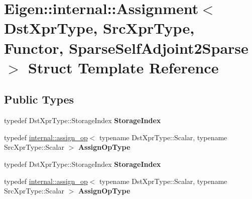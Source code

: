 \hypertarget{struct_eigen_1_1internal_1_1_assignment_3_01_dst_xpr_type_00_01_src_xpr_type_00_01_functor_00_017b35cf78061a31c93b838bddfa619fa3}{}\section{Eigen\+:\+:internal\+:\+:Assignment$<$ Dst\+Xpr\+Type, Src\+Xpr\+Type, Functor, Sparse\+Self\+Adjoint2\+Sparse $>$ Struct Template Reference}
\label{struct_eigen_1_1internal_1_1_assignment_3_01_dst_xpr_type_00_01_src_xpr_type_00_01_functor_00_017b35cf78061a31c93b838bddfa619fa3}
\subsection*{Public Types}
\begin{DoxyCompactItemize}
\item 
\mbox{\label{struct_eigen_1_1internal_1_1_assignment_3_01_dst_xpr_type_00_01_src_xpr_type_00_01_functor_00_017b35cf78061a31c93b838bddfa619fa3_a429efae6af903e6754d8ed4bfd28948a}} 
typedef Dst\+Xpr\+Type\+::\+Storage\+Index {\bfseries Storage\+Index}
\item 
\mbox{\label{struct_eigen_1_1internal_1_1_assignment_3_01_dst_xpr_type_00_01_src_xpr_type_00_01_functor_00_017b35cf78061a31c93b838bddfa619fa3_ad85cf07ae0637a29d606af6dbc03405c}} 
typedef \hyperlink{struct_eigen_1_1internal_1_1assign__op}{internal\+::assign\+\_\+op}$<$ typename Dst\+Xpr\+Type\+::\+Scalar, typename Src\+Xpr\+Type\+::\+Scalar $>$ {\bfseries Assign\+Op\+Type}
\item 
\mbox{\label{struct_eigen_1_1internal_1_1_assignment_3_01_dst_xpr_type_00_01_src_xpr_type_00_01_functor_00_017b35cf78061a31c93b838bddfa619fa3_a429efae6af903e6754d8ed4bfd28948a}} 
typedef Dst\+Xpr\+Type\+::\+Storage\+Index {\bfseries Storage\+Index}
\item 
\mbox{\label{struct_eigen_1_1internal_1_1_assignment_3_01_dst_xpr_type_00_01_src_xpr_type_00_01_functor_00_017b35cf78061a31c93b838bddfa619fa3_ad85cf07ae0637a29d606af6dbc03405c}} 
typedef \hyperlink{struct_eigen_1_1internal_1_1assign__op}{internal\+::assign\+\_\+op}$<$ typename Dst\+Xpr\+Type\+::\+Scalar, typename Src\+Xpr\+Type\+::\+Scalar $>$ {\bfseries Assign\+Op\+Type}
\end{DoxyCompactItemize}
